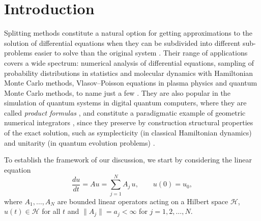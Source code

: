 \documentclass[11pt]{article}
\begin{document}
\section{Introduction}

Splitting methods constitute a natural option for getting approximations to the solution of differential equations when they
can be subdivided into different sub-problems easier to solve than the original system \cite{mclachlan02sm}. 
Their range of applications covers a wide spectrum:
numerical analysis of differential equations, sampling of probability distributions in statistics and molecular dynamics
with Hamiltonian Monte Carlo methods, Vlasov--Poisson equations in plasma physics and quantum Monte Carlo methods, 
to name just a few \cite{blanes24smf}. They are also popular in the simulation of quantum systems in digital quantum computers, where they are called
\emph{product formulas} \cite{childs19nol,chen22epf}, and constitute a paradigmatic example of geometric numerical integrators \cite{hairer06gni}, since they preserve by construction structural
properties of the exact solution, such as symplecticity (in classical Hamiltonian dynamics) and unitarity (in quantum evolution problems) \cite{blanes25aci}.

To establish the framework of our discussion, we start by considering the linear equation
\begin{equation}  \label{basic_eq}
  \frac{du}{dt} =  A u = \sum_{j = 1}^N A_j  \, u, \qquad u(0) = u_0, 
\end{equation}
where $A_1, \ldots, A_N$ are bounded linear operators acting on a Hilbert space $\mathcal{H}$, $u(t) \in \mathcal{H}$ for all $t$ and
$\|A_j\| = a_j < \infty$ for $j=1,2,\ldots,N$. 
\end{document}
